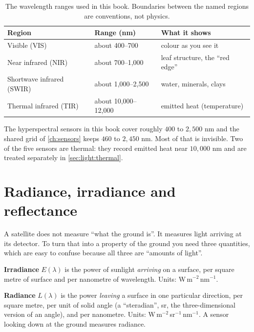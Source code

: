 \begin{table}[htbp]\centering
\caption{The wavelength ranges used in this book. Boundaries between the named regions are
conventions, not physics.}\label{tab:light:ranges}
\begin{tabular}{@{}lll@{}}\toprule
Region & Range (nm) & What it shows \\\midrule
Visible (VIS) & about 400--700 & colour as you see it\\
Near infrared (NIR) & about 700--1{,}000 & leaf structure, the ``red edge''\\
Shortwave infrared (SWIR) & about 1{,}000--2{,}500 & water, minerals, clays\\
Thermal infrared (TIR) & about 10{,}000--12{,}000 & emitted heat (temperature)\\\bottomrule
\end{tabular}
\end{table}

The hyperspectral sensors in this book cover roughly $400$ to $2{,}500$ nm and the shared grid of
\cref{ch:sensors} keeps $460$ to $2{,}450$ nm. Most of that is invisible. Two of the five sensors
are thermal: they record emitted heat near $10{,}000$ nm and are treated separately in
\cref{sec:light:thermal}.

\section{Radiance, irradiance and reflectance}\label{sec:light:reflectance}

A satellite does not measure ``what the ground is''. It measures light arriving at its detector.
To turn that into a property of the ground you need three quantities, which are easy to confuse
because all three are ``amounts of light''.

\begin{definition}[Irradiance]
\textbf{Irradiance} $E(\lambda)$ is the power of sunlight \emph{arriving} on a surface, per
square metre of surface and per nanometre of wavelength. Units: W\,m$^{-2}$\,nm$^{-1}$.
\end{definition}

\begin{definition}[Radiance]
\textbf{Radiance} $L(\lambda)$ is the power \emph{leaving} a surface in one particular direction,
per square metre, per unit of solid angle (a ``steradian'', sr, the three-dimensional version of
an angle), and per nanometre. Units: W\,m$^{-2}$\,sr$^{-1}$\,nm$^{-1}$. A sensor looking down at
the ground measures radiance.
\end{definition}

